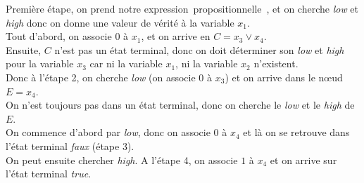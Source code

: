 \documentclass[a4paper, oneside]{report}
\newcommand{\expp}{expression~propositionnelle~}
\newcommand{\largeur}{0.5\linewidth}
\begin{document}
Première étape, on prend notre \expp, et on cherche \textit{low} et \textit{high} donc on donne une valeur de vérité à la variable $x_1$.\\
Tout d'abord, on associe $0$ à $x_1$, et on arrive en $C = x_3 \vee x_4  $.\\
Ensuite, $C$ n'est pas un état terminal, donc on doit déterminer son \textit{low} et \textit{high} pour la variable $x_3$ car ni la variable $x_1$, ni la variable $x_2$ n'existent.\\
Donc à l'étape 2, on cherche \textit{low} (on associe $0$ à $x_3$) et on arrive dans le nœud $E = x_4$.\\
On n'est toujours pas dans un état terminal, donc on cherche le \textit{low} et le \textit{high} de $E$.\\
On commence d'abord par \textit{low}, donc on associe $0$ à $x_4$ et là on se retrouve dans l'état terminal \textit{faux} (étape 3).\\
On peut ensuite chercher \textit{high}. A l'étape 4, on associe $1$ à $x_4$ et on arrive sur l'état terminal \textit{true}.
\newpage
\begin{figure}[!h]
\begin{minipage}[c]{\largeur}
   \end{minipage} \hfill
\begin{minipage}[c]{\largeur}
   \end{minipage} 
\end{figure} 
\end{document}
